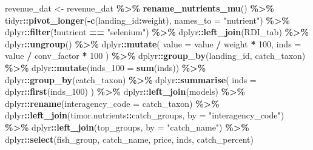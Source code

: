 \documentclass[
]{book}
\newenvironment{Shaded}{\begin{snugshade}}{\end{snugshade}}
\newcommand{\AttributeTok}[1]{\textcolor[rgb]{0.13,0.29,0.53}{#1}}
\newcommand{\DecValTok}[1]{\textcolor[rgb]{0.00,0.00,0.81}{#1}}
\newcommand{\FunctionTok}[1]{\textcolor[rgb]{0.13,0.29,0.53}{\textbf{#1}}}
\newcommand{\NormalTok}[1]{#1}
\newcommand{\OtherTok}[1]{\textcolor[rgb]{0.56,0.35,0.01}{#1}}
\newcommand{\SpecialCharTok}[1]{\textcolor[rgb]{0.81,0.36,0.00}{\textbf{#1}}}
\newcommand{\StringTok}[1]{\textcolor[rgb]{0.31,0.60,0.02}{#1}}
\begin{document}
\begin{Shaded}
\begin{Highlighting}[]
\NormalTok{revenue\_dat }\OtherTok{\textless{}{-}}
\NormalTok{  revenue\_dat }\SpecialCharTok{\%\textgreater{}\%}
  \FunctionTok{rename\_nutrients\_mu}\NormalTok{() }\SpecialCharTok{\%\textgreater{}\%}
\NormalTok{  tidyr}\SpecialCharTok{::}\FunctionTok{pivot\_longer}\NormalTok{(}\SpecialCharTok{{-}}\FunctionTok{c}\NormalTok{(landing\_id}\SpecialCharTok{:}\NormalTok{weight), }\AttributeTok{names\_to =} \StringTok{"nutrient"}\NormalTok{) }\SpecialCharTok{\%\textgreater{}\%}
\NormalTok{  dplyr}\SpecialCharTok{::}\FunctionTok{filter}\NormalTok{(}\SpecialCharTok{!}\NormalTok{nutrient }\SpecialCharTok{==} \StringTok{"selenium"}\NormalTok{) }\SpecialCharTok{\%\textgreater{}\%}
\NormalTok{  dplyr}\SpecialCharTok{::}\FunctionTok{left\_join}\NormalTok{(RDI\_tab) }\SpecialCharTok{\%\textgreater{}\%}
\NormalTok{  dplyr}\SpecialCharTok{::}\FunctionTok{ungroup}\NormalTok{() }\SpecialCharTok{\%\textgreater{}\%}
\NormalTok{  dplyr}\SpecialCharTok{::}\FunctionTok{mutate}\NormalTok{(}
    \AttributeTok{value =}\NormalTok{ value }\SpecialCharTok{/}\NormalTok{ weight }\SpecialCharTok{*} \DecValTok{100}\NormalTok{,}
    \AttributeTok{inds =}\NormalTok{ value }\SpecialCharTok{/}\NormalTok{ conv\_factor }\SpecialCharTok{*} \DecValTok{100}
\NormalTok{  ) }\SpecialCharTok{\%\textgreater{}\%}
\NormalTok{  dplyr}\SpecialCharTok{::}\FunctionTok{group\_by}\NormalTok{(landing\_id, catch\_taxon) }\SpecialCharTok{\%\textgreater{}\%}
\NormalTok{  dplyr}\SpecialCharTok{::}\FunctionTok{mutate}\NormalTok{(}\AttributeTok{inds\_100 =} \FunctionTok{sum}\NormalTok{(inds)) }\SpecialCharTok{\%\textgreater{}\%}
\NormalTok{  dplyr}\SpecialCharTok{::}\FunctionTok{group\_by}\NormalTok{(catch\_taxon) }\SpecialCharTok{\%\textgreater{}\%}
\NormalTok{  dplyr}\SpecialCharTok{::}\FunctionTok{summarise}\NormalTok{(}
    \AttributeTok{inds =}\NormalTok{ dplyr}\SpecialCharTok{::}\FunctionTok{first}\NormalTok{(inds\_100)}
\NormalTok{  ) }\SpecialCharTok{\%\textgreater{}\%}
\NormalTok{  dplyr}\SpecialCharTok{::}\FunctionTok{left\_join}\NormalTok{(models) }\SpecialCharTok{\%\textgreater{}\%}
\NormalTok{  dplyr}\SpecialCharTok{::}\FunctionTok{rename}\NormalTok{(}\AttributeTok{interagency\_code =}\NormalTok{ catch\_taxon) }\SpecialCharTok{\%\textgreater{}\%}
\NormalTok{  dplyr}\SpecialCharTok{::}\FunctionTok{left\_join}\NormalTok{(timor.nutrients}\SpecialCharTok{::}\NormalTok{catch\_groups, }\AttributeTok{by =} \StringTok{"interagency\_code"}\NormalTok{) }\SpecialCharTok{\%\textgreater{}\%}
\NormalTok{  dplyr}\SpecialCharTok{::}\FunctionTok{left\_join}\NormalTok{(top\_groups, }\AttributeTok{by =} \StringTok{"catch\_name"}\NormalTok{) }\SpecialCharTok{\%\textgreater{}\%}
\NormalTok{  dplyr}\SpecialCharTok{::}\FunctionTok{select}\NormalTok{(fish\_group, catch\_name, price, inds, catch\_percent)}


\end{Highlighting}
\end{Shaded}
\end{document}
